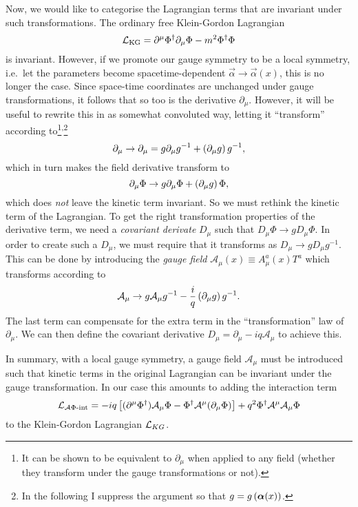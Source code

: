\documentclass[../main.tex]{subfiles}
\begin{document}
Now, we would like to categorise the Lagrangian terms that are invariant under
such transformations.
The ordinary free Klein-Gordon Lagrangian
\begin{equation}
  \mathcal{L}_\text{KG} = \partial^\mu \Phi^\dagger \partial_\mu \Phi - m^2 \Phi^\dagger \Phi
\end{equation}
is invariant.
However, if we promote our gauge symmetry to be a local symmetry, i.e.\ let the
parameters become spacetime-dependent \(\vec{\alpha} \to \vec{\alpha}(x)\),
this is no longer the case.
Since space-time coordinates are unchanged under gauge transformations, it
follows that so too is the derivative \(\partial_\mu\).
However, it will be useful to rewrite this in as somewhat convoluted way,
letting it ``transform'' according to\footnote{It can be shown to be equivalent
  to \(\partial_\mu\) when applied to any field (whether they transform under
  the
  gauge transformations or not).}\textsuperscript{,}\footnote{In the following I suppress the
  argument so that \(g = g\left(\boldsymbol{\alpha}(x)\right)\).}
\begin{equation}
  \partial_\mu \to \partial_\mu = g \partial_\mu g^{-1} +
  \left(\partial_\mu g\right) g^{-1},
\end{equation}
which in turn makes the field derivative transform to
\begin{equation}
  \partial_\mu \Phi \to g \partial_\mu \Phi + \left(\partial_\mu g\right) \Phi,
\end{equation}
which does \emph{not} leave the kinetic term invariant.
So we must rethink the kinetic term of the Lagrangian.
To get the right transformation properties of the derivative term, we need a
\emph{covariant derivate } \(D_\mu\) such that \(D_\mu \Phi \to g D_\mu
\Phi\).
In order to create such a \(D_\mu\), we must require that it transforms as
\(D_\mu \to g D_\mu g^{-1}\).
This can be done by introducing the \emph{gauge field} \(\mathcal{A}_\mu(x)
\equiv A_\mu^a(x) T^a\) which transforms according to
\begin{equation}
  \mathcal{A}_\mu \to g \mathcal{A}_\mu g^{-1} - \frac{i}{q}
  \left(\partial_\mu g\right) g^{-1}.
\end{equation}
The last term can compensate for the extra term in the ``transformation'' law
of \(\partial_\mu\).
We can then define the covariant derivative \(D_\mu = \partial_\mu - iq
\mathcal{A}_\mu\) to achieve this.
\medskip

In summary, with a local gauge symmetry, a gauge field \(\mathcal{A}_\mu\) must
be introduced such that kinetic terms in the original Lagrangian can be
invariant under the gauge transformation. In our case this amounts to adding
the interaction term
\begin{equation}
  \mathcal{L}_{\mathcal{A}\Phi\text{-int}} = -iq\left[(\partial^\mu \Phi^\dagger)
    \mathcal{A}_\mu \Phi - \Phi^\dagger \mathcal{A}^\mu (\partial_\mu
    \Phi)\right] + q^2
  \Phi^\dagger \mathcal{A}^\mu \mathcal{A}_\mu \Phi
\end{equation}
to the Klein-Gordon Lagrangian \(\mathcal{L}_{KG}\).
\end{document}
